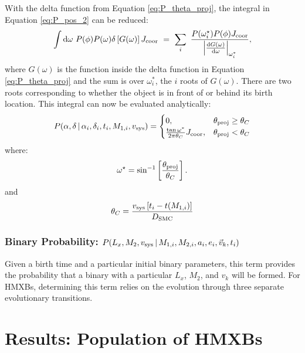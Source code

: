 \documentclass[12pt, preprint]{aastex}
\newcommand{\given}{\,|\,}
\newcommand{\dd}{\mathrm{d}}
\begin{document}
With the delta function from Equation \ref{eq:P_theta_proj}, the integral in Equation \ref{eq:P_pos_2} can be reduced:
\begin{equation}
\int \dd \omega\ P(\phi) P(\omega) \delta \left[ G(\omega) \right]  J_{\rm coor}\  =\ \sum_i\ \frac{P(\omega_i^{\star}) P(\phi)  J_{\rm coor}}{ \left| \frac{ \dd G (\omega) }{\dd \omega} \right|_{\omega_i^*}},
\end{equation}
where $G(\omega)$ is the function inside the delta function in Equation \ref{eq:P_theta_proj} and the sum is over $\omega_i^*$, the $i$ roots of $G(\omega)$. There are two roots corresponding to whether the object is in front of or behind its birth location. This integral can now be evaluated analytically:
\begin{equation}
P(\alpha, \delta \given \alpha_i, \delta_i, t_i, M_{1,i}, v_{\rm sys} ) =
\begin{cases} 
      0, & \theta_{\rm proj} \geq \theta_C\\
     \frac{\tan \omega^*}{2 \pi \theta_C}  J_{\rm coor}, & \theta_{\rm proj} < \theta_C 
   \end{cases}
\end{equation}
where:
\begin{equation}
\omega^{\star} = \sin^{-1} \left[ \frac{\theta_{\rm proj}}{\theta_C} \right].
\end{equation}
and
\begin{equation}
\theta_C = \frac{v_{\rm sys} \left[ t_i - t(M_{1,i}) \right]}{D_{\rm SMC}} \label{eq:theta_c}
\end{equation}


\subsubsection{Binary Probability: $P(L_x, M_2, v_{\rm sys} \given M_{1,i}, M_{2,i}, a_i, e_i, \vec{v}_k, t_i)$}

Given a birth time and a particular initial binary parameters, this term provides the probability that a binary with a particular $L_x$, $M_2$, and $v_k$ will be formed. For HMXBs, determining this term relies on the evolution through three separate evolutionary transitions. 




\section{Results: Population of HMXBs}
\end{document}
